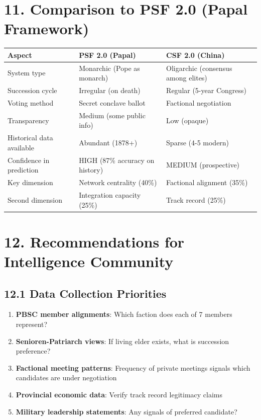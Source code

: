 \documentclass[11pt]{article}
\begin{document}
\section{11. Comparison to PSF 2.0 (Papal Framework)}

\begin{table}[h]
\centering
\begin{tabular}{|l|l|l|}
\hline
\textbf{Aspect} & \textbf{PSF 2.0 (Papal)} & \textbf{CSF 2.0 (China)} \\
\hline
System type & Monarchic (Pope as monarch) & Oligarchic (consensus among elites) \\
Succession cycle & Irregular (on death) & Regular (5-year Congress) \\
Voting method & Secret conclave ballot & Factional negotiation \\
Transparency & Medium (some public info) & Low (opaque) \\
Historical data available & Abundant (1878+) & Sparse (4-5 modern) \\
Confidence in prediction & HIGH (87\% accuracy on history) & MEDIUM (prospective) \\
Key dimension & Network centrality (40\%) & Factional alignment (35\%) \\
Second dimension & Integration capacity (25\%) & Track record (25\%) \\
\hline
\end{tabular}
\end{table}

\section{12. Recommendations for Intelligence Community}

\subsection{12.1 Data Collection Priorities}

\begin{enumerate}
\item \textbf{PBSC member alignments}: Which faction does each of 7 members represent?
\item \textbf{Senioren-Patriarch views}: If living elder exists, what is succession preference?
\item \textbf{Factional meeting patterns}: Frequency of private meetings signals which candidates are under negotiation
\item \textbf{Provincial economic data}: Verify track record legitimacy claims
\item \textbf{Military leadership statements}: Any signals of preferred candidate?
\end{enumerate}
\end{document}
